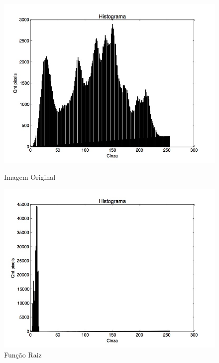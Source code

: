 \documentclass{article}
\begin{document}
\FloatBarrier
\begin{figure}[!htb]
\begin{minipage}[b]{0.45\linewidth}
\centering
\includegraphics[scale=0.25]{Histo_lena_B.jpg}
\caption{Imagem Original}
\label{fig:original}
\end{minipage}
\hspace{0.5cm}
\begin{minipage}[b]{0.45\linewidth}
\centering
\includegraphics[scale=0.25]{Histo_TransNLinearRoot.jpg}
\caption{Função Raiz}
\label{fig:rota}
\end{minipage}
\end{figure}
\FloatBarrier
\end{document}

